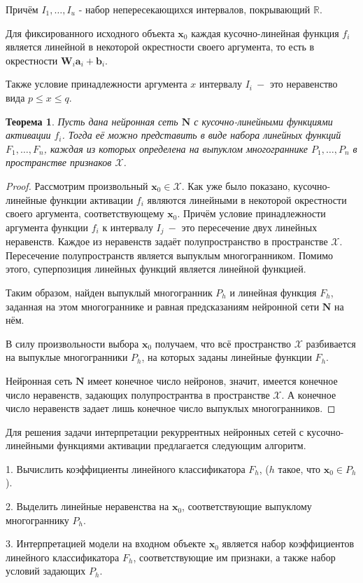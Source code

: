 \documentclass[a4paper, 12pt]{article}
\newtheorem{theorem}{Теорема}
\begin{document}
Причём $I_1,\dots,I_u$ - набор непересекающихся интервалов, покрывающий $\mathbb{R}$.

Для фиксированного исходного объекта $\mathbf{x}_0$ каждая кусочно-линейная функция $f_i$ является линейной в некоторой окрестности своего аргумента, то есть в окрестности $\mathbf{W}_i \mathbf{a}_{i} + \mathbf{b}_i$.

Также условие принадлежности аргумента $x$ интервалу $I_i~-$ это неравенство вида $p \leq x \leq q$.

\begin{theorem}
Пусть дана нейронная сеть $\mathbf{N}$ с кусочно-линейными функциями активации $f_i$. Тогда её можно представить в виде набора линейных функций $F_1,\dots,F_n$, каждая из которых определена на выпуклом многограннике $P_1,\dots,P_n$ в пространстве признаков $\mathcal{X}$.
\end{theorem}
\begin{proof}
Рассмотрим произвольный $\mathbf{x}_0\in\mathcal{X}$. Как уже было показано, кусочно-линейные функции активации $f_i$ являются линейными в некоторой окрестности своего аргумента, соответствующему $\mathbf{x}_0$. Причём условие принадлежности аргумента функции $f_i$ к интервалу $I_j~-$ это пересечение двух линейных неравенств. Каждое из неравенств задаёт полупространство в пространстве $\mathcal{X}$. Пересечение полупространств является выпуклым многогранником. Помимо этого, суперпозиция линейных функций является линейной функцией.

Таким образом, найден выпуклый многогранник $P_h$ и линейная функция $F_h$, заданная на этом многограннике и равная предсказаниям нейронной сети $\mathbf{N}$ на нём.

В силу произвольности выбора $\mathbf{x}_0$ получаем, что всё пространство $\mathcal{X}$ разбивается на выпуклые многогранники $P_h$, на которых заданы линейные функции $F_h$.

Нейронная сеть $\mathbf{N}$ имеет конечное число нейронов, значит, имеется конечное число неравенств, задающих полупространтва в пространстве $\mathcal{X}$. А конечное число неравенств задает лишь конечное число выпуклых многогранников. 
\end{proof}

Для решения задачи интерпретации рекуррентных нейронных сетей с кусочно-линейными функциями активации предлагается следующим алгоритм.

1. Вычислить коэффициенты линейного классификатора $F_h$, ($h$ такое, что $\mathbf{x}_0\in P_h$).

2. Выделить линейные неравенства на $\mathbf{x}_0$, соответствующие выпуклому многограннику $P_h$.

3. Интерпретацией модели на входном объекте $\mathbf{x}_0$ является набор коэффициентов линейного классификатора $F_h$, соответствующие им признаки, а также набор условий задающих $P_h$.



\end{document}
